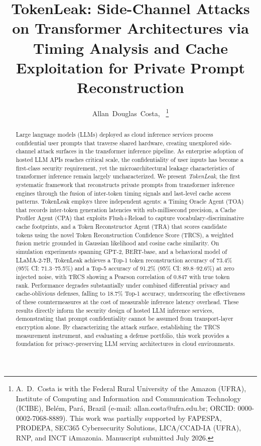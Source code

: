 \documentclass[journal,10pt,twocolumn]{IEEEtran}
\title{TokenLeak: Side-Channel Attacks on Transformer Architectures
       via Timing Analysis and Cache Exploitation for Private
       Prompt Reconstruction}
\author{Allan~Douglas~Costa,~\IEEEmembership{Member,~IEEE}
\thanks{A.~D.~Costa is with the Federal Rural University of the Amazon
(UFRA), Institute of Computing and Information and Communication
Technology (ICIBE), Bel\'{e}m, Par\'{a}, Brazil
(e-mail: allan.costa@ufra.edu.br; ORCID: 0000-0002-7068-8889).
This work was partially supported by FAPESPA, PRODEPA, SEC365 Cybersecurity
Solutions, LICA/CCAD-IA (UFRA), RNP, and INCT iAmazonia.
Manuscript submitted July 2026.}}
\begin{document}
\maketitle

\begin{abstract}
Large language models (LLMs) deployed as cloud inference services
process confidential user prompts that traverse shared hardware,
creating unexplored side-channel attack surfaces in the transformer
inference pipeline.
As enterprise adoption of hosted LLM APIs reaches critical scale,
the confidentiality of user inputs has become a first-class security
requirement, yet the microarchitectural leakage characteristics of
transformer inference remain largely uncharacterized.
We present \emph{TokenLeak}, the first systematic framework that
reconstructs private prompts from transformer inference engines
through the fusion of inter-token timing signals and last-level
cache access patterns.
TokenLeak employs three independent agents: a Timing Oracle Agent
(TOA) that records inter-token generation latencies with
sub-millisecond precision, a Cache Profiler Agent (CPA) that
exploits Flush+Reload to capture vocabulary-discriminative cache
footprints, and a Token Reconstructor Agent (TRA) that scores
candidate tokens using the novel Token Reconstruction Confidence
Score (TRCS), a weighted fusion metric grounded in Gaussian
likelihood and cosine cache similarity.
On simulation experiments spanning GPT-2, BERT-base, and a
behavioral model of LLaMA-2-7B, TokenLeak achieves a Top-1
token reconstruction accuracy of 73.4\% (95\% CI: 71.3--75.5\%)
and a Top-5 accuracy of 91.2\% (95\% CI: 89.8--92.6\%) at
zero injected noise, with TRCS showing a Pearson correlation
of 0.847 with true token rank.
Performance degrades substantially under combined differential
privacy and cache-oblivious defenses, falling to 18.7\% Top-1
accuracy, underscoring the effectiveness of these countermeasures
at the cost of measurable inference latency overhead.
These results directly inform the security design of hosted
LLM inference services, demonstrating that prompt confidentiality
cannot be assumed from transport-layer encryption alone.
By characterizing the attack surface, establishing the TRCS
measurement instrument, and evaluating a defense portfolio,
this work provides a foundation for privacy-preserving LLM
serving architectures in cloud environments.
\end{abstract}
\end{document}
